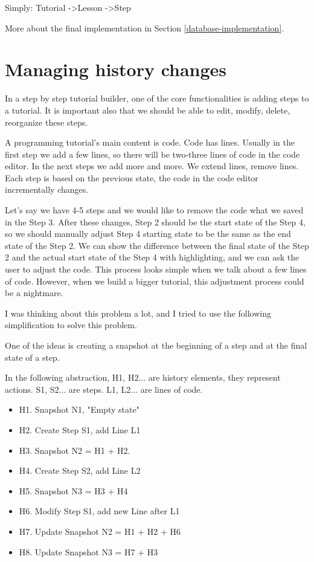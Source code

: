 \documentclass[11pt, a4paper, oneside, openright, medskipamount]{report}
\begin{document}
Simply: Tutorial -\textgreater Lesson -\textgreater Step

More about the final implementation in Section \ref{database-implementation}.

\section{Managing history changes} \label{history}

In a step by step tutorial builder, one of the core functionalities is adding steps to a tutorial. It is important also that we should be able to edit, modify, delete, reorganize these steps.

A programming tutorial’s main content is code. Code has lines. Usually in the first step we add a few lines, so there will be two-three lines of code in the code editor. In the next steps we add more and more. We extend lines, remove lines. Each step is based on the previous state, the code in the code editor incrementally changes.

Let's say we have 4-5 steps and we would like to remove the code what we saved in the Step 3. After these changes, Step 2 should be the start state of the Step 4, so we should manually adjust Step 4 starting state to be the same as the end state of the Step 2. We can show the difference between the final state of the Step 2 and the actual start state of the Step 4 with highlighting, and we can ask the user to adjust the code. This process looks simple when we talk about a few lines of code. However, when we build a bigger tutorial, this adjustment process could be a nightmare.

I was thinking about this problem a lot, and I tried to use the following simplification to solve this problem.

One of the ideas is creating a snapshot at the beginning of a step and at the final state of a step.

In the following abstraction, H1, H2... are history elements, they represent actions. S1, S2... are steps. L1, L2... are lines of code.

\begin{itemize}[noitemsep]
\item H1. Snapshot N1, "Empty state"
\item H2. Create Step S1, add Line L1
\item H3. Snapshot N2 = H1 + H2.
\item H4. Create Step S2, add Line L2
\item H5. Snapshot N3 = H3 + H4
\item H6. Modify Step S1, add new Line after L1
\item H7. Update Snapshot N2 = H1 + H2 + H6
\item H8. Update Snapshot N3 = H7 + H3
\end{itemize}
\end{document}
